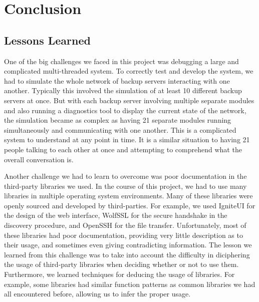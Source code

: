 \chapter{Conclusion}
\section{Lessons Learned}

One of the big challenges we faced in this project was debugging a large and complicated multi-threaded system.
To correctly test and develop the system, we had to simulate the whole network of backup servers interacting with one another.
Typically this involved the simulation of at least 10 different backup servers at once. But with each backup server involving multiple
separate modules and also running a diagnostics tool to display the current state of the network, the simulation became as complex as having 21 separate modules running simultaneously and communicating with one another. This is a complicated system to understand at any point in time. It is a similar situation to having 21 people talking to each other at once and attempting to comprehend what the overall conversation is.

Another challenge we had to learn to overcome was poor documentation in the third-party libraries we used.  In the course of this project, we had to use many libraries in multiple operating system environments.  Many of these libraries were openly sourced and developed by third-parties.  For example, we used IgniteUI for the design of the web interface, WolfSSL for the secure handshake in the discovery procedure, and OpenSSH for the file transfer.  Unfortunately, most of these libraries had poor documentation, providing very little description as to their usage, and sometimes even giving contradicting information.  The lesson we learned from this challenge was to take into account the difficulty in diciphering the usage of third-party libraries when deciding whether or not to use them.  Furthermore, we learned techniques for deducing the usage of libraries.  For example, some libraries had similar function patterns as common libraries we had all encountered before, allowing us to infer the proper usage.